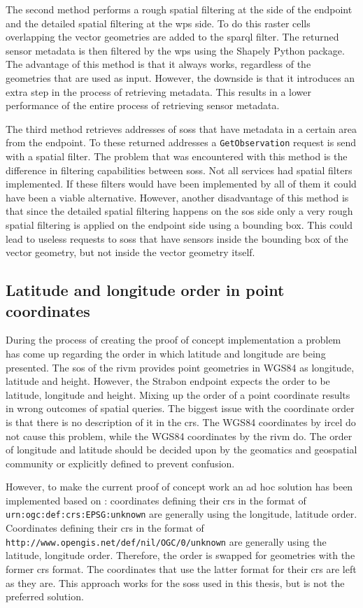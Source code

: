 The second method performs a rough spatial filtering at the side of the endpoint and the detailed spatial filtering at the \ac{wps} side. To do this raster cells overlapping the vector geometries are added to the \ac{sparql} filter. The returned sensor metadata is then filtered by the \ac{wps} using the Shapely Python package. The advantage of this method is that it always works, regardless of the geometries that are used as input. However, the downside is that it introduces an extra step in the process of retrieving metadata. This results in a lower performance of the entire process of retrieving sensor metadata.  

The third method retrieves addresses of \aclp{sos} that have metadata in a certain area from the endpoint. To these returned addresses a \texttt{GetObservation} request is send with a spatial filter. The problem that was encountered with this method is the difference in filtering capabilities between \aclp{sos}. Not all services had spatial filters implemented. If these filters would have been implemented by all of them it could have been a viable alternative. However, another disadvantage of this method is that since the detailed spatial filtering happens on the \ac{sos} side only a very rough spatial filtering is applied on the endpoint side using a bounding box. This could lead to useless requests to \aclp{sos} that have sensors inside the bounding box of the vector geometry, but not inside the vector geometry itself. 

\subsection{Latitude and longitude order in point coordinates}
During the process of creating the proof of concept implementation a problem has come up regarding the order in which latitude and longitude are being presented. The \ac{sos} of the \ac{rivm} provides point geometries in WGS84 as longitude, latitude and height. However, the Strabon endpoint expects the order to be latitude, longitude and height. Mixing up the order of a point coordinate results in wrong outcomes of spatial queries. The biggest issue with the coordinate order is that there is no description of it in the \ac{crs}. The WGS84 coordinates by \ac{ircel} do not cause this problem, while the WGS84 coordinates by the \ac{rivm} do. The order of longitude and latitude should be decided upon by the geomatics and geospatial community or explicitly defined to prevent confusion. 

However, to make the current proof of concept work an ad hoc solution has been implemented based on \cite{GEO:GDAL}: coordinates defining their \ac{crs} in the format of \texttt{urn:ogc:def:crs:EPSG:unknown} are generally using the longitude, latitude order. Coordinates defining their \ac{crs} in the format of \texttt{http://www.opengis.net/def/nil/OGC/0/unknown} are generally using the latitude, longitude order. Therefore, the order is swapped for geometries with the former \ac{crs} format. The coordinates that use the latter format for their \ac{crs} are left as they are. This approach works for the \aclp{sos} used in this thesis, but is not the preferred solution.   

